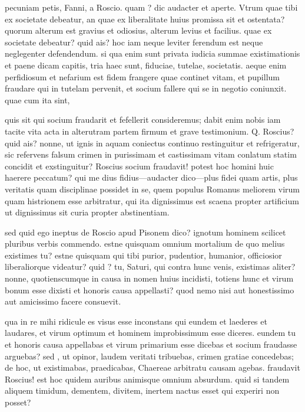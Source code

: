  pecuniam petis, Fanni, a Roscio. quam ? dic audacter et aperte. Vtrum quae tibi ex societate debeatur, an quae ex liberalitate huius promissa sit et ostentata? quorum alterum est gravius et odiosius, alterum levius et facilius. quae ex societate debeatur? quid ais? hoc iam neque leviter ferendum est neque neglegenter defendendum. si qua enim sunt privata iudicia summae existimationis et paene dicam capitis, tria haec sunt, fiduciae, tutelae, societatis. aeque enim perfidiosum et nefarium est fidem frangere quae continet vitam, et pupillum fraudare qui in tutelam pervenit, et socium fallere qui se in negotio coniunxit. quae cum ita sint,

 quis sit qui socium fraudarit et fefellerit consideremus; dabit enim nobis iam tacite vita acta in alterutram partem firmum et grave testimonium. Q. Roscius? quid ais? nonne, ut ignis in aquam coniectus continuo restinguitur et refrigeratur, sic refervens falsum crimen in purissimam et castissimam vitam conlatum statim concidit et exstinguitur? Roscius socium fraudavit! potest hoc homini huic haerere peccatum? qui me dius fidius—audacter dico—plus fidei quam artis, plus veritatis quam disciplinae possidet in se, quem populus Romanus meliorem virum quam histrionem esse arbitratur, qui ita dignissimus est scaena propter artificium ut dignissimus sit curia propter abstinentiam.

 sed quid ego ineptus de Roscio apud Pisonem dico? ignotum hominem scilicet pluribus verbis commendo. estne quisquam omnium mortalium de quo melius existimes tu? estne quisquam qui tibi purior, pudentior, humanior, officiosior liberaliorque videatur? quid ? tu, Saturi, qui contra hunc venis, existimas aliter? nonne, quotienscumque in causa in nomen huius incidisti, totiens hunc et virum bonum esse dixisti et honoris causa appellasti? quod nemo nisi aut honestissimo aut amicissimo facere consuevit.

 qua in re mihi ridicule es visus esse inconstans qui eundem et laederes et laudares, et virum optimum et hominem improbissimum esse diceres. eundem tu et honoris causa appellabas et virum primarium esse dicebas et socium fraudasse arguebas? sed , ut opinor, laudem veritati tribuebas, crimen gratiae concedebas; de hoc, ut existimabas, praedicabas, Chaereae arbitratu causam agebas. fraudavit Roscius! est hoc quidem auribus animisque omnium absurdum. quid si tandem aliquem timidum, dementem, divitem, inertem nactus esset qui experiri non posset?

